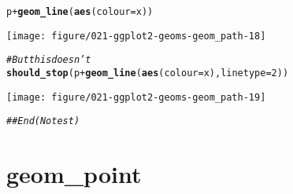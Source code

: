 \documentclass[a4paper,titlepage]{tufte-handout}\usepackage[]{graphicx}\usepackage[]{color}
\makeatletter
\def\maxwidth{ %
  \ifdim\Gin@nat@width>\linewidth
    \linewidth
  \else
    \Gin@nat@width
  \fi
}
\newcommand{\hlnum}[1]{\textcolor[rgb]{0.686,0.059,0.569}{#1}}%
\newcommand{\hlcom}[1]{\textcolor[rgb]{0.678,0.584,0.686}{\textit{#1}}}%
\newcommand{\hlopt}[1]{\textcolor[rgb]{0,0,0}{#1}}%
\newcommand{\hlstd}[1]{\textcolor[rgb]{0.345,0.345,0.345}{#1}}%
\newcommand{\hlkwc}[1]{\textcolor[rgb]{0.333,0.667,0.333}{#1}}%
\newcommand{\hlkwd}[1]{\textcolor[rgb]{0.737,0.353,0.396}{\textbf{#1}}}%
\newenvironment{kframe}{%
 \def\at@end@of@kframe{}%
 \ifinner\ifhmode%
  \def\at@end@of@kframe{\end{minipage}}%
  \begin{minipage}{\columnwidth}%
 \fi\fi%
 \def\FrameCommand##1{\hskip\@totalleftmargin \hskip-\fboxsep
 \colorbox{shadecolor}{##1}\hskip-\fboxsep
     \hskip-\linewidth \hskip-\@totalleftmargin \hskip\columnwidth}%
 \MakeFramed {\advance\hsize-\width
   \@totalleftmargin\z@ \linewidth\hsize
   \@setminipage}}%
 {\par\unskip\endMakeFramed%
 \at@end@of@kframe}
\newenvironment{knitrout}{}{} %
\makeatother
\begin{document}
\begin{knitrout}
\begin{kframe}\begin{alltt}
\hlstd{p} \hlopt{+} \hlkwd{geom_line}\hlstd{(}\hlkwd{aes}\hlstd{(}\hlkwc{colour} \hlstd{= x))}
\end{alltt}
\end{kframe}
\texttt{[image: figure/021-ggplot2-geoms-geom\_path-18]} 
\begin{kframe}\begin{alltt}
\hlcom{# But this doesn't}
\hlkwd{should_stop}\hlstd{(p} \hlopt{+} \hlkwd{geom_line}\hlstd{(}\hlkwd{aes}\hlstd{(}\hlkwc{colour} \hlstd{= x),} \hlkwc{linetype}\hlstd{=}\hlnum{2}\hlstd{))}
\end{alltt}
\end{kframe}
\texttt{[image: figure/021-ggplot2-geoms-geom\_path-19]} 
\begin{kframe}\begin{alltt}
\hlcom{## End(No test)}
\end{alltt}
\end{kframe}
\end{knitrout}


\section{geom\_point}
\end{document}
